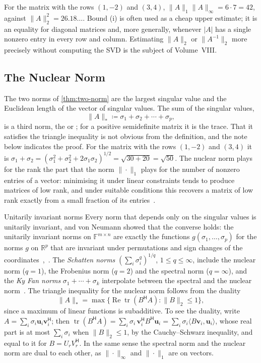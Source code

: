 For the matrix with the rows $(1,-2)$ and $(3,4)$, $\|A\|_1\|A\|_\infty=6\cdot7=42$, against $\|A\|_2^2=26.18\ldots$. Bound (i) is often used as a cheap upper estimate; it is an equality for diagonal matrices and, more generally, whenever $|A|$ has a single nonzero entry in every row and column. Estimating $\|A\|_2$ or $\|A^{-1}\|_2$ more precisely without computing the SVD is the subject of Volume~VIII.

\subsection{The Nuclear Norm}

The two norms of \cref{thm:two-norm} are the largest singular value and the Euclidean length of the vector of singular values. The sum of the singular values,
\[
\|A\|_*\coloneqq\sigma_1+\sigma_2+\cdots+\sigma_p ,
\]
is a third norm, the  or ; for a positive semidefinite matrix it is the trace. That it satisfies the triangle inequality is not obvious from the definition, and the note below indicates the proof. For the matrix with the rows $(1,-2)$ and $(3,4)$ it is $\sigma_1+\sigma_2=(\sigma_1^2+\sigma_2^2+2\sigma_1\sigma_2)^{1/2}=\sqrt{30+20}=\sqrt{50}$. The nuclear norm plays for the rank the part that the norm $\|\cdot\|_1$ plays for the number of nonzero entries of a vector: minimising it under linear constraints tends to produce matrices of low rank, and under suitable conditions this recovers a matrix of low rank exactly from a small fraction of its entries~\cite{candes2009}.

\begin{note}{Unitarily invariant norms}
Every norm that depends only on the singular values is unitarily invariant, and von Neumann showed that the converse holds: the unitarily invariant norms on $\mathbb F^{m\times n}$ are exactly the functions $g(\sigma_1,\ldots,\sigma_p)$ for the norms $g$ on $\mathbb R^p$ that are invariant under permutations and sign changes of the coordinates~\cite{vonneumann1937},~\cite[Sect.~7.4]{horn2013}. The \emph{Schatten norms} $(\sum_i\sigma_i^q)^{1/q}$, $1\le q\le\infty$, include the nuclear norm ($q=1$), the Frobenius norm ($q=2$) and the spectral norm ($q=\infty$), and the \emph{Ky Fan norms} $\sigma_1+\cdots+\sigma_k$ interpolate between the spectral and the nuclear norm~\cite{fan1951}. The triangle inequality for the nuclear norm follows from the duality
\[
\|A\|_*=\max\bigl\{\operatorname{Re}\operatorname{tr}(B^{\mathsf H}A):\|B\|_2\le1\bigr\},
\]
since a maximum of linear functions is subadditive. To see the duality, write $A=\sum_i\sigma_i\mathbf u_i\mathbf v_i^{\mathsf H}$; then $\operatorname{tr}(B^{\mathsf H}A)=\sum_i\sigma_i\,\mathbf v_i^{\mathsf H}B^{\mathsf H}\mathbf u_i=\sum_i\sigma_i\langle B\mathbf v_i,\mathbf u_i\rangle$, whose real part is at most $\sum_i\sigma_i$ when $\|B\|_2\le1$, by the Cauchy--Schwarz inequality, and equal to it for $B=U_rV_r^{\mathsf H}$. In the same sense the spectral norm and the nuclear norm are dual to each other, as $\|\cdot\|_\infty$ and $\|\cdot\|_1$ are on vectors.
\end{note}

